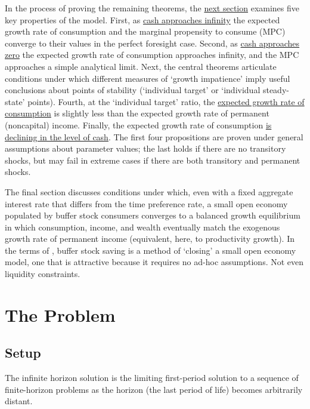 \documentclass[BufferStockTheory]{subfiles}
\begin{document}
In the process of proving the remaining theorems, the \hyperlink{AnalysisoftheConvergedConsumptionFunction}{next section} examines five key properties of the model. First, as \hyperlink{LimitsAsmtToInfty}{cash approaches infinity} the expected growth rate of consumption and the marginal propensity to consume (MPC) converge to their values in the perfect foresight case. Second, as \hyperlink{LimitsAsmtToZero}{cash approaches zero} the expected growth rate of consumption approaches infinity, and the MPC approaches a simple analytical limit.  Next, the central theorems articulate conditions under which different measures of `growth impatience' imply useful conclusions about points of stability (`individual target' or `individual steady-state' points).  Fourth, at the `individual target' ratio, the \hyperlink{cGroLTpGro}{expected growth rate of consumption} is slightly less than the expected growth rate of permanent (noncapital) income.  Finally, the expected growth rate of consumption \hyperlink{dcgdxneg}{is declining in the level of cash}. The first four propositions are proven under general assumptions about parameter values; the last holds if there are no transitory shocks, but may fail in extreme cases if there are both transitory and permanent shocks.

The final section discusses conditions under which, even with a fixed aggregate interest rate that differs from the time preference rate, a small open economy populated by buffer stock consumers converges to a balanced growth equilibrium in which consumption, income, and wealth eventually match the exogenous growth rate of permanent income (equivalent, here, to productivity growth). In the terms of \cite{schmitt2003closing}, buffer stock saving is a method of `closing' a small open economy model, one that is attractive because it requires no ad-hoc assumptions.  Not even liquidity constraints.


\hypertarget{The-Problem}{}
\section{The Problem}

\subsection{Setup}\label{subsec:Setup}\label{subsec:setup}

The infinite horizon solution is the limiting first-period solution to a sequence of finite-horizon problems as the horizon (the last period of life) becomes arbitrarily distant.
\end{document}
